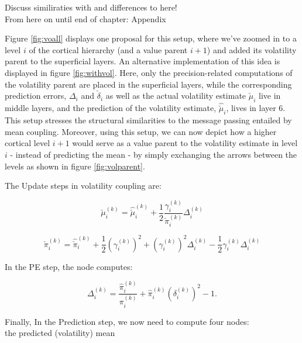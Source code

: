 Discuss similiraties with and differences to \cite{Kanai2015} here!\\

From here on until end of chapter: Appendix


Figure \ref{fig:voall} displays one proposal for this setup, where we've zoomed in to a level $i$ of the cortical hierarchy (and a value parent $i+1$) and added its volatility parent to the superficial layers. An alternative implementation of this idea is displayed in figure \ref{fig:withvol}. Here, only the precision-related computations of the volatility parent are placed in the superficial layers, while the corresponding prediction errors, $\Delta_i$ and $\check{\delta}_i$ as well as the actual volatility estimate $\check{\mu}_i$ live in middle layers, and the prediction of the volatility estimate, $\hat{\check{\mu}}_i$, lives in layer 6. This setup stresses the structural similarities to the message passing entailed by mean coupling. Moreover, using this setup, we can now depict how a higher cortical level $i+1$ would serve as a value parent to the volatility estimate in level $i$ - instead of predicting the mean - by simply exchanging the arrows between the levels as shown in figure \ref{fig:volparent}. 


The \textsf{Update} steps in volatility coupling are:

\begin{equation}
	\check{\mu}_i^{(k)} = \hat{\check{\mu}}_i^{(k)} + \frac{1}{2} \frac{\gamma_{i}^{(k)}}{\check{\pi}_i^{(k)}} \Delta_{i}^{(k)}
\end{equation}

\begin{equation}
	\check{\pi}_i^{(k)} = \hat{\check{\pi}}_i^{(k)} + \frac{1}{2} (\gamma_{i}^{(k)})^2 + (\gamma_{i}^{(k)})^2 \Delta_{i}^{(k)} - \frac{1}{2} \gamma_{i}^{(k)} \Delta_{i}^{(k)}
\end{equation}

In the \textsf{PE} step, the node computes:

\begin{equation}
  \Delta_i^{(k)} = \frac{\hat{\pi}_i^{(k)}}{\pi_{i}^{(k)}} + \hat{\pi}_i^{(k)} (\delta_i^{(k)})^2 - 1. 
\end{equation}

Finally, In the \textsf{Prediction} step, we now need to compute four nodes: \\
the predicted (volatility) mean

